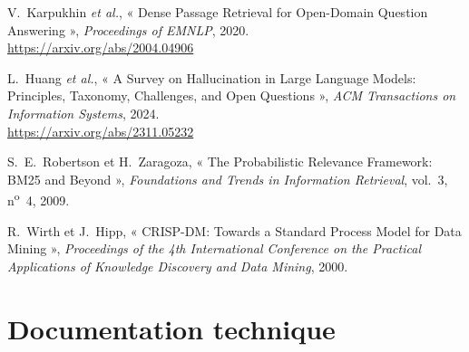 \begin{enumerate}[label={[\arabic*]},leftmargin=2.2em]
\item V.~Karpukhin \emph{et al.}, « Dense Passage Retrieval for Open-Domain
Question Answering », \emph{Proceedings of EMNLP}, 2020. \\
\url{https://arxiv.org/abs/2004.04906}

\item L.~Huang \emph{et al.}, « A Survey on Hallucination in Large Language
Models: Principles, Taxonomy, Challenges, and Open Questions », \emph{ACM
Transactions on Information Systems}, 2024. \\
\url{https://arxiv.org/abs/2311.05232}

\item S.~E.~Robertson et H.~Zaragoza, « The Probabilistic Relevance Framework:
BM25 and Beyond », \emph{Foundations and Trends in Information Retrieval},
vol.~3, n\textsuperscript{o}~4, 2009.

\item R.~Wirth et J.~Hipp, « CRISP-DM: Towards a Standard Process Model for Data
Mining », \emph{Proceedings of the 4th International Conference on the Practical
Applications of Knowledge Discovery and Data Mining}, 2000.

\end{enumerate}

\section*{Documentation technique}

